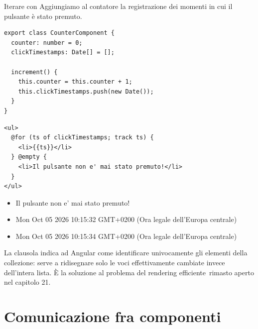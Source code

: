 \begin{esempio}{Iterare con }
Aggiungiamo al contatore la registrazione dei momenti in cui il pulsante è
stato premuto.

\begin{lstlisting}[style=ts, name=counter.component.ts]
export class CounterComponent {
  counter: number = 0;
  clickTimestamps: Date[] = [];

  increment() {
    this.counter = this.counter + 1;
    this.clickTimestamps.push(new Date());
  }
}
\end{lstlisting}

\begin{affianco}[0.4][c]
\codicepiccolo
\begin{lstlisting}[style=html, name=counter.component.html]
<ul>
  @for (ts of clickTimestamps; track ts) {
    <li>{{ts}}</li>
  } @empty {
    <li>Il pulsante non e' mai stato premuto!</li>
  }
</ul>
\end{lstlisting}
\risultato
\begin{browser}
  \begin{itemize}[leftmargin=14pt, itemsep=0pt, topsep=0pt]
    \item Il pulsante non e' mai stato premuto!
  \end{itemize}
\end{browser}
\begin{browser}
  \footnotesize
  \begin{itemize}[leftmargin=14pt, itemsep=0pt, topsep=0pt]
    \item Mon Oct 05 2026 10:15:32 GMT+0200 (Ora legale dell'Europa centrale)
    \item Mon Oct 05 2026 10:15:34 GMT+0200 (Ora legale dell'Europa centrale)
  \end{itemize}
\end{browser}
\end{affianco}

La clausola  indica ad Angular come identificare univocamente gli
elementi della collezione: serve a ridisegnare solo le voci effettivamente
cambiate invece dell'intera lista. È la soluzione al problema del
\guillemotleft rendering efficiente\guillemotright\ rimasto aperto nel capitolo 21.
\end{esempio}

\section{Comunicazione fra componenti}

